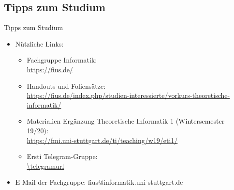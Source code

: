 \subsection{Tipps zum Studium}
\begin{frame}[fragile]{Tipps zum Studium}
    \begin{itemize}
        \item Nützliche Links:\\
            \begin{itemize}
                \item Fachgruppe Informatik:\\
                \url{https://fius.de/}
                \item Handouts und Foliensätze:\\ \url{https://fius.de/index.php/studien-interessierte/vorkurs-theoretische-informatik/}
                \item Materialien Ergänzung Theoretische Informatik 1 (Wintersemester 19/20): \\
                \url{https://fmi.uni-stuttgart.de/ti/teaching/w19/eti1/}
                \item Ersti Telegram-Gruppe:\\
                \qrcode[hyperlink]{\telegramurl}
                 \url{\telegramurl}
        	\end{itemize}
        \item E-Mail der Fachgruppe: fius@informatik.uni-stuttgart.de

    \end{itemize}
\end{frame}


